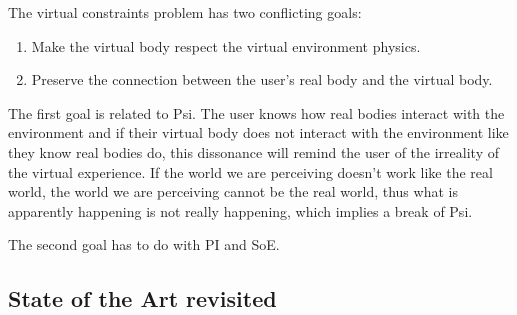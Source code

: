 The virtual constraints problem has two conflicting goals:

\begin{enumerate}
\item Make the virtual body respect the virtual environment physics.
\item Preserve the connection between the user's real body and the virtual body.
\end{enumerate}

The first goal is related to Psi. The user knows how real bodies interact with the environment and if their virtual body does not interact with the environment like they know real bodies do, this dissonance will remind the user of the irreality of the virtual experience. If the world we are perceiving doesn't work like the real world, the world we are perceiving cannot be the real world, thus what is apparently happening is not really happening, which implies a break of Psi.

The second goal has to do with PI and SoE.


\subsection{State of the Art revisited}
\label{subsec:soaRevisited}

